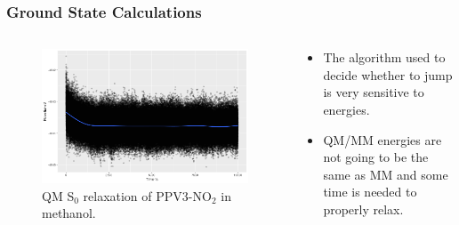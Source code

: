 \documentclass{beamer}
\begin{document}
\begin{frame}
  \frametitle{Ground State Calculations}
\begin{columns}[c]
\begin{figure}
  \includegraphics[width=\textwidth]{Images/qmgroundrelaxation}
  \caption{QM S$_0$ relaxation of PPV3-NO$_2$ in methanol.}
\end{figure}
 
  \begin{block}{}
    \begin{itemize}
      \item The algorithm used to decide whether to jump is very sensitive to energies.
      \item QM/MM energies are not going to be the same as MM and some time is
        needed to properly relax.
    \end{itemize}
  \end{block}
\end{columns}
\end{frame}
\end{document}
